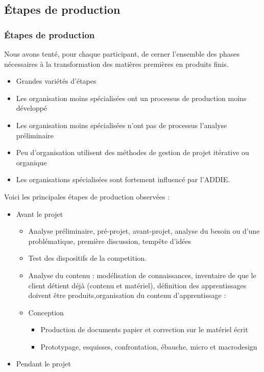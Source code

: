 					 \subsection{Étapes de production} 
						\begin{frame}[allowframebreaks]
						\frametitle{Étapes de production}
                        			Nous avons tenté, pour chaque participant, de cerner l’ensemble des phases nécessaires à la transformation des matières premières en produits finis.
						\begin{itemize}
						\item Grandes variétés d'étapes
						\item Les organisation moins spécialisées ont un processus de production moins développé
						\item Les organisation moins spécialisées n'ont pas de processus l'analyse préliminaire
						\item Peu d'organisation utilisent des méthodes de gestion de projet itérative ou organique
						\item Les organisations spécialisées sont fortement influencé par l'ADDIE.
						\end{itemize}
						Voici les principales étapes de production observées :	
						\begin{itemize}
						\framebreak
						\item Avant le projet
							\begin{itemize}
							\item Analyse préliminaire, pré-projet, avant-projet, analyse du besoin ou d'une problématique, première discussion, tempête d’idées
							\item Test des dispositifs de la competition.
							\item Analyse du contenu : modélisation de connaissances, inventaire de que le client détient déjà (contenu et matériel), définition des apprentissages doivent être produits,organisation du contenu d’apprentissage :
							\item Conception
								\begin{itemize}
								\item Production de documents papier et  correction sur le matériel écrit
								\item Prototypage, esquisses, confrontation, ébauche, micro et macrodesign
								\end{itemize}
							\end{itemize}
						\framebreak
						\item Pendant le projet

\end{itemize}
\end{frame}
